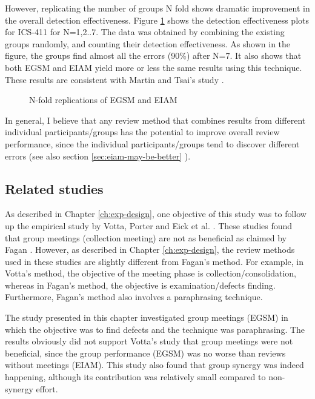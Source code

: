 However,  replicating the number of groups N fold
shows dramatic improvement in the overall detection effectiveness.
Figure \ref{nfold} shows the detection effectiveness plots for ICS-411
for N=1,2..7. The data was obtained by  combining the existing
groups randomly, and counting their detection effectiveness. As shown
in the figure, the groups find almost all the errors
(90\%) after N=7. It also shows that both EGSM and EIAM yield more or
less the same results using this technique.
These results are consistent with Martin and Tsai's study \cite{Martin90}.

\begin{figure}[htb]
 {\centerline{}}
 \caption{N-fold replications of EGSM and EIAM}
 \label{nfold}
\end{figure}

In general, I believe that any review method that combines
results from different individual participants/groups has the
potential to improve
overall review performance, since the individual
participants/groups tend to discover different errors (see also section
\ref{sec:eiam-may-be-better} ).

\subsection{Related studies}
As described in Chapter \ref{ch:exp-design},  
one objective of this study was to follow up the empirical study by
Votta, Porter and Eick et al. \cite{Votta93,Porter94a,Eick92}.
These studies found that group meetings (collection
meeting) are not as beneficial as claimed by Fagan \cite{Fagan76}.
However, as described in Chapter \ref{ch:exp-design}, the review 
methods used in these studies are slightly different from Fagan's
method.  For example, in Votta's
method, the objective of the meeting phase is
collection/consolidation, whereas in Fagan's method, the objective is
examination/defects finding. Furthermore, Fagan's method also involves
a paraphrasing technique. 

The study presented in this chapter investigated group meetings
(EGSM) in which the objective was to find defects and the technique was
paraphrasing. The results obviously did not support Votta's
study that group meetings were not beneficial, since the group
performance (EGSM) was no worse than reviews without meetings
(EIAM). This study 
also found that group synergy was indeed happening, although its
contribution was relatively small compared to non-synergy effort.

